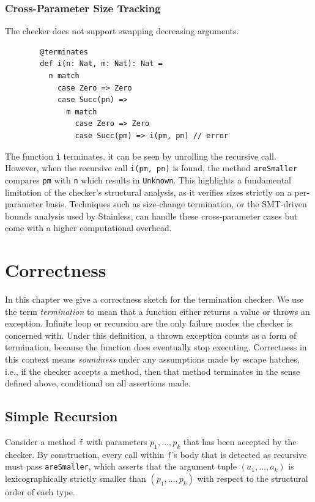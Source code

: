 \subsection{Cross-Parameter Size Tracking}
The checker does not support swapping decreasing arguments.
\begin{verbatim}
        @terminates
        def i(n: Nat, m: Nat): Nat =
          n match
            case Zero => Zero
            case Succ(pn) =>
              m match
                case Zero => Zero
                case Succ(pm) => i(pm, pn) // error
\end{verbatim}
The function \texttt{i} terminates, it can be seen by unrolling the recursive
call. However, when the recursive call \texttt{i(pm, pn)} is found, the method
\texttt{areSmaller} compares \texttt{pm} with \texttt{n} which results in
\texttt{Unknown}. 
This highlights a fundamental limitation of the checker's structural analysis,
as it verifies sizes strictly on a per-parameter basis. Techniques such as
size-change termination, or the SMT-driven bounds analysis used by Stainless,
can handle these cross-parameter cases but come with a higher computational
overhead.


\chapter{Correctness}

In this chapter we give a correctness sketch for the termination checker. We use
the term \emph{termination} to mean that a function either returns a value or
throws an exception. Infinite loop or recursion are the only failure modes the
checker is concerned with.
Under this definition, a thrown exception counts as a form of termination,
because the function does eventually stop executing.
Correctness in this context means \emph{soundness} under any assumptions made by
escape hatches, i.e., if the checker accepts a method, then that method
terminates in the sense defined above, conditional on all assertions made.

\section{Simple Recursion}
Consider a method \texttt{f} with parameters $p_1, \ldots, p_k$ that has been
accepted by the checker. By construction, every call within \texttt{f}'s body
that is detected as recursive must pass \texttt{areSmaller}, which asserts that
the argument tuple $(a_1, \ldots, a_k)$ is lexicographically strictly smaller
than $(p_1, \ldots, p_k)$ with respect to the structural order of each type.

